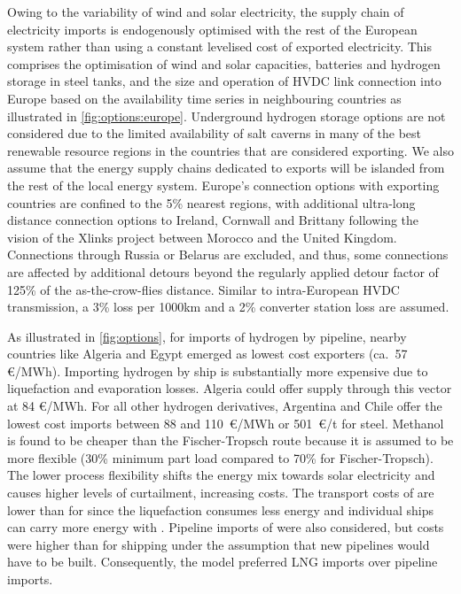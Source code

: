 Owing to the variability of wind and solar electricity, the supply chain of
electricity imports is endogenously optimised with the rest of the European
system rather than using a constant levelised cost of exported electricity. This
comprises the optimisation of wind and solar capacities, batteries and hydrogen
storage in steel tanks, and the size and operation of HVDC link connection into
Europe based on the availability time series in neighbouring countries as
illustrated in \cref{fig:options:europe}. Underground hydrogen storage options
are not considered due to the limited availability of salt caverns in many of
the best renewable resource regions in the countries that are considered
exporting.\cite{hevinUndergroundStorage2019} We also assume that the energy
supply chains dedicated to exports will be islanded from the rest of the local
energy system. Europe's connection options with exporting countries are confined
to the 5\% nearest regions, with additional ultra-long distance connection
options to Ireland, Cornwall and Brittany following the vision of the Xlinks
project between Morocco and the United Kingdom.\cite{xlinksMoroccoUKPower2023}
Connections through Russia or Belarus are excluded, and thus, some connections
are affected by additional detours beyond the regularly applied detour factor of
125\% of the as-the-crow-flies distance. Similar to intra-European HVDC
transmission, a 3\% loss per 1000km and a 2\% converter station loss are assumed.


As illustrated in \cref{fig:options}, for imports of hydrogen by pipeline,
nearby countries like Algeria and Egypt emerged as lowest cost exporters (ca.~57
\euro{}/MWh). Importing hydrogen by ship is substantially more expensive due to
liquefaction and evaporation losses. Algeria could offer supply through this
vector at 84 \euro{}/MWh. For all other hydrogen derivatives, Argentina and
Chile offer the lowest cost imports between 88 and 110~\euro{}/MWh or
501~\euro{}/t for steel. Methanol is found to be cheaper than the
Fischer-Tropsch route because it is assumed to be more flexible (30\% minimum
part load compared to 70\% for
Fischer-Tropsch).\cite{brownUltralongdurationEnergy2023} The lower process
flexibility shifts the energy mix towards solar electricity and causes higher
levels of curtailment, increasing costs. The transport costs of  are
lower than for  since the liquefaction consumes less energy and
individual ships can carry more energy with . Pipeline imports of
 were also considered, but costs were higher than for 
shipping under the assumption that new pipelines would have to be built.
Consequently, the model preferred LNG imports over pipeline imports.
